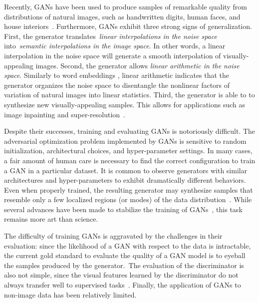\documentclass{article}
\begin{document}
Recently, GANs have been used to produce samples of remarkable quality from
distributions of natural images, such as handwritten digits, human faces, and
house interiors~\citep{dcgan}.  Furthermore, GANs exhibit three strong signs of
generalization. First, the generator translates~\emph{linear interpolations in
the noise space} into~\emph{semantic interpolations in the image space}. In
other words, a linear interpolation in the noise space will generate a smooth
interpolation of visually-appealing images.  Second, the generator allows
\emph{linear arithmetic in the noise space}.  Similarly to word embeddings
\citep{mikolov2013efficient}, linear arithmetic indicates that the generator
organizes the noise space to disentangle the nonlinear factors of variation of
natural images into linear statistics.
Third, the generator is able to to synthesize new visually-appealing samples.
This allows for applications such as image inpainting
\citep{IizukaSIGGRAPH2017} and super-resolution~\citep{ledig2016photo}.

Despite their successes, training and evaluating GANs is notoriously difficult.
The adversarial optimization problem implemented by GANs is sensitive to random
initialization, architectural choices, and hyper-parameter settings.  In many
cases, a fair amount of human care is necessary to find the correct
configuration to train a GAN in a particular dataset. It is common to observe
generators with similar architectures and hyper-parameters to exhibit
dramatically different behaviors.  Even when properly trained, the resulting
generator may synthesize samples that resemble only a few localized regions (or
modes) of the data distribution~\citep{gan_tutorial}. While several advances
have been made to stabilize the training of GANs~\citep{salimans2016improved},
this task remains more art than science.

The difficulty of training GANs is aggravated by the challenges in their evaluation:
since the likelihood of a GAN with respect to the data is intractable, the
current gold standard to evaluate the quality of a GAN model is to eyeball the
samples produced by the generator.~The evaluation of the discriminator is also
not simple, since the visual features learned by the discriminator
do not always transfer well to supervised
tasks~\citep{donahue2016adversarial,dumoulin2016adversarially}. Finally, the
application of GANs to non-image data has been relatively limited.
\end{document}

